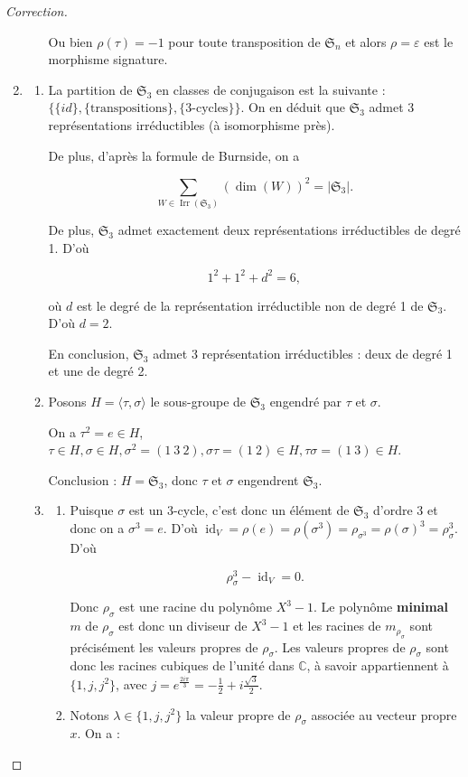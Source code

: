 \documentclass[french]{book}
\theoremstyle{definition}
\begin{document}
\begin{proof}[Correction]
\begin{enumerate}
\begin{enumerate}
      Ou bien \(\rho(\tau) = -1\) pour toute transposition de \(\mathfrak{S}_n\) et alors \(\rho = \varepsilon\) est le morphisme signature.
    \end{enumerate}
    \item
    \begin{enumerate}
      \item La partition de \(\mathfrak{S}_{3}\) en classes de conjugaison est la suivante : \(\{ \{ id \}, \{ \text{transpositions}\}, \{ 3\text{-cycles} \}\}\). On en déduit que \(\mathfrak{S}_{3}\) admet 3 représentations irréductibles (à isomorphisme près).

      De plus, d'après la formule de Burnside, on a

      \[\sum_{W \in \operatorname{Irr}(\mathfrak{S}_{3})} (\operatorname{dim}(W)) ^2 = \left\lvert \mathfrak{S}_{3} \right\rvert.\]

      De plus, \(\mathfrak{S}_{3}\) admet exactement deux représentations irréductibles de degré 1. D'où

      \[1 ^2 + 1 ^2+ d ^2 = 6,\]

      où \(d\) est le degré de la représentation irréductible non de degré 1 de \(\mathfrak{S}_{3}\).  D'où \(d=2\).

      En conclusion, \(\mathfrak{S}_{3}\) admet 3 représentation irréductibles : deux de degré 1 et une de degré 2.

      \item Posons \(H = \langle \tau, \sigma \rangle\) le sous-groupe de \(\mathfrak{S}_{3}\) engendré par \(\tau\) et \(\sigma\).

      On a \(\tau ^2 = e \in H\), \(\tau \in H, \sigma \in H, \sigma ^2 = (1 \ 3 \ 2), \sigma \tau = (1 \ 2)\in H, \tau \sigma = (1 \ 3)\in H\).

      Conclusion : \(H = \mathfrak{S}_{3}\), donc \(\tau\) et \(\sigma\) engendrent \(\mathfrak{S}_{3}\).

      \item
      \begin{enumerate}
        \item Puisque \(\sigma\) est un 3-cycle, c'est donc un élément de \(\mathfrak{S}_3\) d'ordre 3 et donc on a \(\sigma ^3 = e\). D'où \(\operatorname{id}_V = \rho(e) = \rho(\sigma ^3) = \rho _{\sigma ^3} = \rho(\sigma)^3 = \rho _{\sigma}^3\). D'où

        \[\rho _{\sigma} ^3 - \operatorname{id}_V = 0.\]

        Donc \(\rho _{\sigma}\) est une racine du polynôme \(X ^3-1\). Le polynôme \textbf{minimal} \(m\) de \(\rho _{\sigma}\) est donc un diviseur de \(X ^3 - 1\) et les racines de \(m _{\rho _{\sigma}}\) sont précisément les valeurs propres de \(\rho _{\sigma}\). Les valeurs propres de \(\rho _{\sigma}\) sont donc les racines cubiques de l'unité dans \(\mathbb{C}\), à savoir appartiennent à \(\{ 1, j, j ^2 \}\), avec \(j = e^{\frac{2i \pi}{3}} = - \frac{1}{2} + i \frac{\sqrt{ 3 }}{2}\).
        \item Notons \(\lambda \in \{ 1, j, j^2 \}\) la valeur propre de \(\rho _{\sigma}\) associée au vecteur propre \(x\). On a :


\end{enumerate}
\end{enumerate}
\end{enumerate}
\end{proof}
\end{document}
